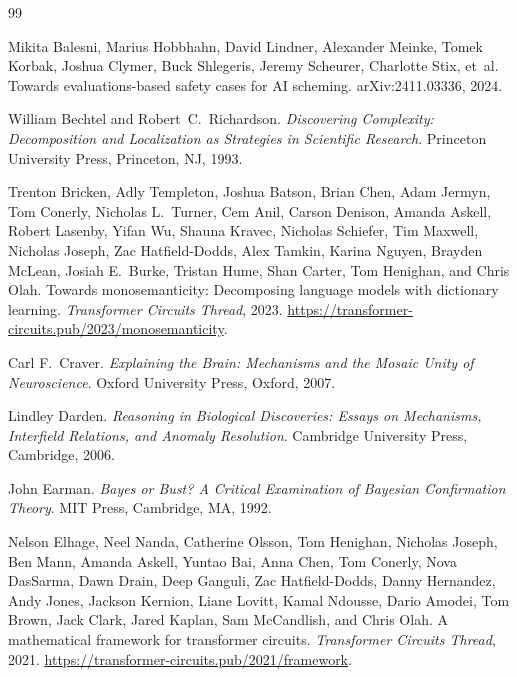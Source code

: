 \documentclass[11pt]{article}
\theoremstyle{remark}
\begin{document}

\begin{thebibliography}{99}

Mikita Balesni, Marius Hobbhahn, David Lindner, Alexander Meinke, Tomek
  Korbak, Joshua Clymer, Buck Shlegeris, Jeremy Scheurer, Charlotte Stix,
  et~al.
\newblock Towards evaluations-based safety cases for {AI} scheming.
\newblock arXiv:2411.03336, 2024.

William Bechtel and Robert~C.\ Richardson.
\newblock \emph{Discovering Complexity: Decomposition and Localization as
  Strategies in Scientific Research}.
\newblock Princeton University Press, Princeton, NJ, 1993.

Trenton Bricken, Adly Templeton, Joshua Batson, Brian Chen, Adam Jermyn,
  Tom Conerly, Nicholas L.\ Turner, Cem Anil, Carson Denison, Amanda Askell,
  Robert Lasenby, Yifan Wu, Shauna Kravec, Nicholas Schiefer, Tim Maxwell,
  Nicholas Joseph, Zac Hatfield-Dodds, Alex Tamkin, Karina Nguyen, Brayden
  McLean, Josiah E.\ Burke, Tristan Hume, Shan Carter, Tom Henighan, and
  Chris Olah.
\newblock Towards monosemanticity: Decomposing language models with dictionary
  learning.
\newblock \emph{Transformer Circuits Thread}, 2023.
\newblock \url{https://transformer-circuits.pub/2023/monosemanticity}.

Carl F.\ Craver.
\newblock \emph{Explaining the Brain: Mechanisms and the Mosaic Unity of
  Neuroscience}.
\newblock Oxford University Press, Oxford, 2007.

Lindley Darden.
\newblock \emph{Reasoning in Biological Discoveries: Essays on Mechanisms,
  Interfield Relations, and Anomaly Resolution}.
\newblock Cambridge University Press, Cambridge, 2006.

John Earman.
\newblock \emph{Bayes or Bust? A Critical Examination of Bayesian Confirmation
  Theory}.
\newblock MIT Press, Cambridge, MA, 1992.

Nelson Elhage, Neel Nanda, Catherine Olsson, Tom Henighan, Nicholas Joseph,
  Ben Mann, Amanda Askell, Yuntao Bai, Anna Chen, Tom Conerly, Nova DasSarma,
  Dawn Drain, Deep Ganguli, Zac Hatfield-Dodds, Danny Hernandez, Andy Jones,
  Jackson Kernion, Liane Lovitt, Kamal Ndousse, Dario Amodei, Tom Brown, Jack
  Clark, Jared Kaplan, Sam McCandlish, and Chris Olah.
\newblock A mathematical framework for transformer circuits.
\newblock \emph{Transformer Circuits Thread}, 2021.
\newblock \url{https://transformer-circuits.pub/2021/framework}.


\end{thebibliography}
\end{document}
